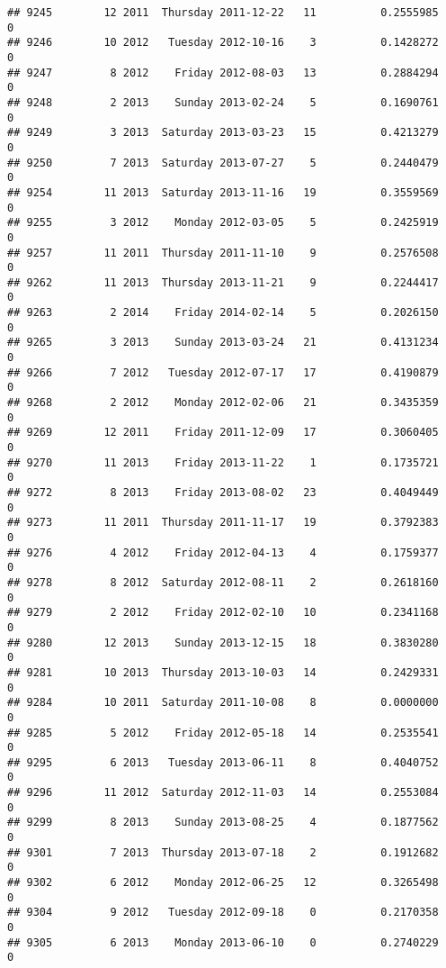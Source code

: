 \documentclass[
]{article}
\begin{document}
\begin{verbatim}
## 9245        12 2011  Thursday 2011-12-22   11          0.2555985             0
## 9246        10 2012   Tuesday 2012-10-16    3          0.1428272             0
## 9247         8 2012    Friday 2012-08-03   13          0.2884294             0
## 9248         2 2013    Sunday 2013-02-24    5          0.1690761             0
## 9249         3 2013  Saturday 2013-03-23   15          0.4213279             0
## 9250         7 2013  Saturday 2013-07-27    5          0.2440479             0
## 9254        11 2013  Saturday 2013-11-16   19          0.3559569             0
## 9255         3 2012    Monday 2012-03-05    5          0.2425919             0
## 9257        11 2011  Thursday 2011-11-10    9          0.2576508             0
## 9262        11 2013  Thursday 2013-11-21    9          0.2244417             0
## 9263         2 2014    Friday 2014-02-14    5          0.2026150             0
## 9265         3 2013    Sunday 2013-03-24   21          0.4131234             0
## 9266         7 2012   Tuesday 2012-07-17   17          0.4190879             0
## 9268         2 2012    Monday 2012-02-06   21          0.3435359             0
## 9269        12 2011    Friday 2011-12-09   17          0.3060405             0
## 9270        11 2013    Friday 2013-11-22    1          0.1735721             0
## 9272         8 2013    Friday 2013-08-02   23          0.4049449             0
## 9273        11 2011  Thursday 2011-11-17   19          0.3792383             0
## 9276         4 2012    Friday 2012-04-13    4          0.1759377             0
## 9278         8 2012  Saturday 2012-08-11    2          0.2618160             0
## 9279         2 2012    Friday 2012-02-10   10          0.2341168             0
## 9280        12 2013    Sunday 2013-12-15   18          0.3830280             0
## 9281        10 2013  Thursday 2013-10-03   14          0.2429331             0
## 9284        10 2011  Saturday 2011-10-08    8          0.0000000             0
## 9285         5 2012    Friday 2012-05-18   14          0.2535541             0
## 9295         6 2013   Tuesday 2013-06-11    8          0.4040752             0
## 9296        11 2012  Saturday 2012-11-03   14          0.2553084             0
## 9299         8 2013    Sunday 2013-08-25    4          0.1877562             0
## 9301         7 2013  Thursday 2013-07-18    2          0.1912682             0
## 9302         6 2012    Monday 2012-06-25   12          0.3265498             0
## 9304         9 2012   Tuesday 2012-09-18    0          0.2170358             0
## 9305         6 2013    Monday 2013-06-10    0          0.2740229             0

\end{verbatim}
\end{document}

